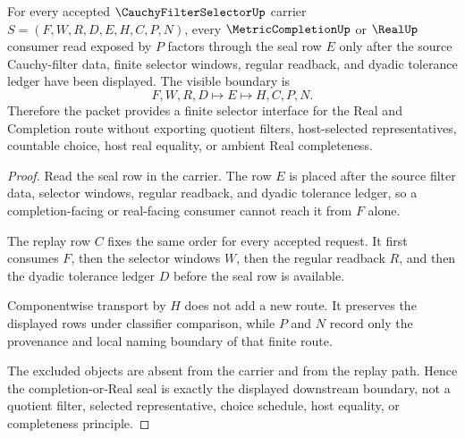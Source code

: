 \begin{theorem}
\label{thm:cauchy-filter-selector-real-seal-boundary}
For every accepted $\CauchyFilterSelectorUp$ carrier $S=(F,W,R,D,E,H,C,P,N)$, every $\MetricCompletionUp$ or $\RealUp$ consumer read exposed by $P$ factors through the seal row $E$ only after the source Cauchy-filter data, finite selector windows, regular readback, and dyadic tolerance ledger have been displayed. The visible boundary is
$$
F,W,R,D \longmapsto E \longmapsto H,C,P,N .
$$
Therefore the packet provides a finite selector interface for the Real and Completion route without exporting quotient filters, host-selected representatives, countable choice, host real equality, or ambient Real completeness.
\end{theorem}
\begin{proof}
Read the seal row in the carrier. The row $E$ is placed after the source filter data, selector windows, regular readback, and dyadic tolerance ledger, so a completion-facing or real-facing consumer cannot reach it from $F$ alone.

The replay row $C$ fixes the same order for every accepted request. It first consumes $F$, then the selector windows $W$, then the regular readback $R$, and then the dyadic tolerance ledger $D$ before the seal row is available.

Componentwise transport by $H$ does not add a new route. It preserves the displayed rows under classifier comparison, while $P$ and $N$ record only the provenance and local naming boundary of that finite route.

The excluded objects are absent from the carrier and from the replay path. Hence the completion-or-Real seal is exactly the displayed downstream boundary, not a quotient filter, selected representative, choice schedule, host equality, or completeness principle.
\end{proof}

\begin{closurestatus}{\CauchyFilterSelectorUp}
  \theoryclosure{\seedClosure}
  \formalstatus{\unformalizedV}
\end{closurestatus}

